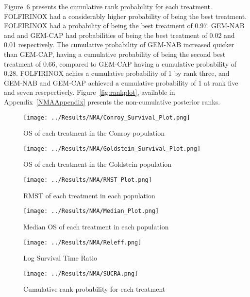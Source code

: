 Figure~\ref{fig:sucra} presents the cumulative rank probability for each treatment. FOLFIRINOX had a considerably higher probability of being the best treatment. FOLFIRINOX had a probability of being the best treatment of 0.97. GEM-NAB and and GEM-CAP had probabilities of being the best treatment of 0.02 and 0.01 respectively. The cumulative probability of GEM-NAB increased quicker than GEM-CAP, having a cumulative probability of being the second best treatment of 0.66, compared to GEM-CAP having a cumulative probability of $0.28$. FOLFIRINOX achies a cumulative probability of 1 by rank three, and GEM-NAB and GEM-CAP achieved a cumulative probability of 1 at rank five and seven resepectively. Figure~\ref{fig:rankplot}, available in Appendix~\ref{NMAAppendix} presents the non-cumulative posterior ranks. 

\begin{figure}[h]
    \centering
    \texttt{[image: ../Results/NMA/Conroy\_Survival\_Plot.png]}
    \caption{OS of each treatment in the Conroy population}
    \label{fig:pred_survbc_conroy}
\end{figure}

\begin{figure}[h]
    \centering
    \texttt{[image: ../Results/NMA/Goldstein\_Survival\_Plot.png]}
    \caption{OS of each treatment in the Goldstein population}
    \label{fig:pred_survbc_goldstein}
\end{figure}

\begin{figure}[h]
    \centering
    \texttt{[image: ../Results/NMA/RMST\_Plot.png]}
    \caption{RMST of each treatment in each population}
    \label{fig:pred_rmstbc}
\end{figure}

\begin{figure}[h]
    \centering
    \texttt{[image: ../Results/NMA/Median\_Plot.png]}
    \caption{Median OS of each treatment in each population}
    \label{fig:pred_medianbc}
\end{figure}

\begin{figure}[h]
    \centering
    \texttt{[image: ../Results/NMA/Releff.png]}
    \caption{Log Survival Time Ratio}
    \label{fig:releff}
\end{figure}

\begin{figure}[h]
    \centering
    \texttt{[image: ../Results/NMA/SUCRA.png]}
    \caption{Cumulative rank probability for each treatment}
    \label{fig:sucra}
\end{figure}
